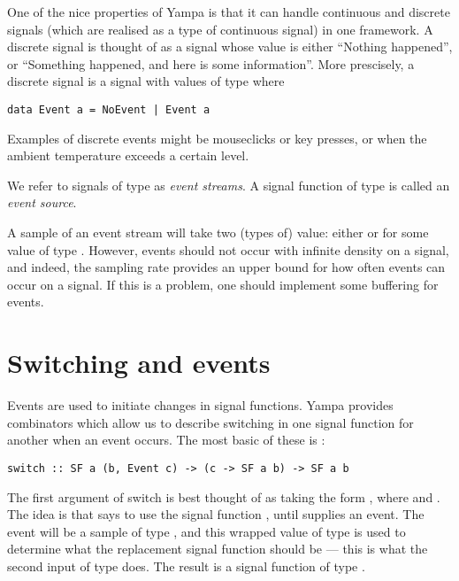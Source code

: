 One of the nice properties of Yampa is that it can handle continuous and discrete signals (which are realised as a type of continuous signal) in one framework. A discrete signal is thought of as a signal whose value is either ``Nothing happened'', or ``Something happened, and here is some information''. More prescisely, a discrete signal is a signal with values of type  where

\begin{lstlisting}
data Event a = NoEvent | Event a
\end{lstlisting}

Examples of discrete events might be mouseclicks or key presses, or when the ambient temperature exceeds a certain level.

We refer to signals of  type as \emph{event streams}. A signal function of type  is called an \emph{event source}.

A sample of an event stream will take two (types of) value: either  or  for some value of type . However, events should not occur with infinite density on a signal, and indeed, the sampling rate provides an upper bound for how often events can occur on a signal. If this is a problem, one should implement some buffering for events.

\section{Switching and events}

Events are used to initiate changes in signal functions. Yampa provides combinators which allow us to describe switching in one signal function for another when an event occurs. The most basic of these is :

\begin{lstlisting}
switch :: SF a (b, Event c) -> (c -> SF a b) -> SF a b
\end{lstlisting}

\noindent The first argument of switch is best thought of as taking the form , where  and . The idea is that  says to use the signal function , until  supplies an event. The event will be a sample of type , and this wrapped value of type  is used to determine what the replacement signal function should be --- this is what the second input of type  does. The result is a signal function of type .


